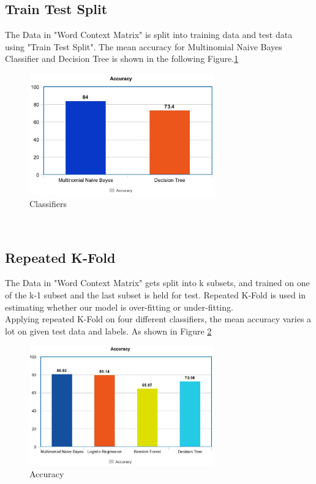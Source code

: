 \documentclass[a4paper]{article}
\begin{document}
\subsection{Train Test Split}
The Data in "Word Context Matrix" is split into training data and test data using "Train Test Split". The mean accuracy for Multinomial Naive Bayes Classifier and Decision Tree is shown in the following Figure.\ref{fig:train test split}
\begin{figure}[H]
 \centering
   \includegraphics[width= 8cm]{traintestsplit}
\caption{Classifiers}
  \label{fig:train test split}
\end{figure}
\\
\subsection{Repeated K-Fold}
The Data in "Word Context Matrix" gets split into k subsets, and trained on one of the k-1 subset and the last subset is held for test. Repeated K-Fold is used in estimating whether our model is over-fitting or under-fitting.
\\
Applying repeated K-Fold on four different classifiers, the mean accuracy varies a lot on given test data and labels. As shown in Figure \ref{fig:Repeated KFold Accuracies}
\begin{figure}[H]
 \centering
   \includegraphics[width= 8cm]{RepeatedKFoldAccuracies}
\caption{Accuracy}
  \label{fig:Repeated KFold Accuracies}
\end{figure}
\end{document}
